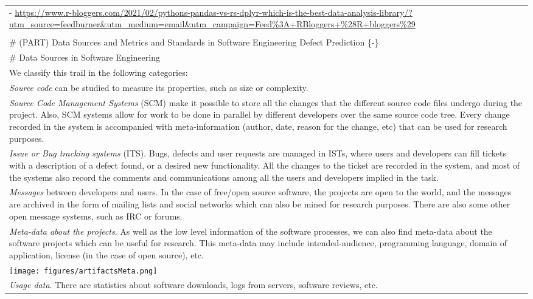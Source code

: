 \documentclass[
]{book}
\begin{document}
\begin{longtable}[]{@{}
  >{\raggedleft\arraybackslash}p{}@{}}
- \url{https://www.r-bloggers.com/2021/02/pythons-pandas-vs-rs-dplyr-which-is-the-best-data-analysis-library/?utm_source=feedburner\&utm_medium=email\&utm_campaign=Feed\%3A+RBloggers+\%28R+bloggers\%29} \\
 \\
\# (PART) Data Sources and Metrics and Standards in Software Engineering Defect Prediction \{-\} \\
\# Data Sources in Software Engineering \\
We classify this trail in the following categories: \\
* \emph{Source code} can be studied to measure its properties, such as size or complexity. \\
* \emph{Source Code Management Systems} (SCM) make it possible to store all the changes that the different source code files undergo during the project. Also, SCM systems allow for work to be done in parallel by different developers over the same source code tree. Every change recorded in the system is accompanied with meta-information (author, date, reason for the change, etc) that can be used for research purposes. \\
* \emph{Issue or Bug tracking systems} (ITS). Bugs, defects and user requests are managed in ISTs, where users and developers can fill tickets with a description of a defect found, or a desired new functionality. All the changes to the ticket are recorded in the system, and most of the systems also record the comments and communications among all the users and developers implied in the task. \\
* \emph{Messages} between developers and users. In the case of free/open source software, the projects are open to the world, and the messages are archived in the form of mailing lists and social networks which can also be mined for research purposes. There are also some other open message systems, such as IRC or forums. \\
* \emph{Meta-data about the projects}. As well as the low level information of the software processes, we can also find meta-data about the software projects which can be useful for research. This meta-data may include intended-audience, programming language, domain of application, license (in the case of open source), etc. \\
\texttt{[image: figures/artifactsMeta.png]} \\
* \emph{Usage data}. There are statistics about software downloads, logs from servers, software reviews, etc. \\

\end{longtable}
\end{document}
